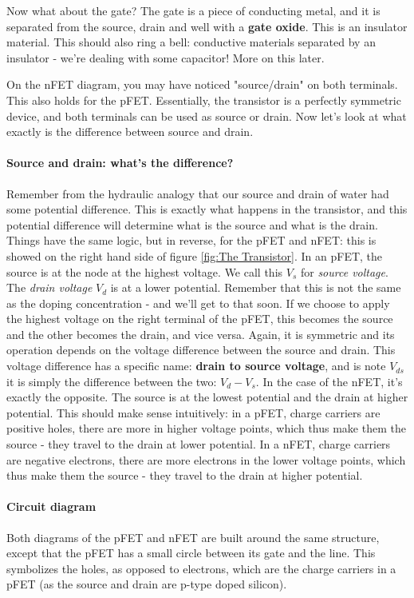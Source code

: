 Now what about the gate? The gate is a piece of conducting metal, and it is separated from the source, drain and well with a \textbf{gate oxide}. This is an insulator material. This should also ring a bell: conductive materials separated by an insulator - we're dealing with some capacitor! More on this later.  

On the nFET diagram, you may have noticed "source/drain" on both terminals. This also holds for the pFET. Essentially, the transistor is a perfectly symmetric device, and both terminals can be used as source or drain. Now let's look at what exactly is the difference between source and drain.

\paragraph{Source and drain: what's the difference?} Remember from the hydraulic analogy that our source and drain of water had some potential difference. This is exactly what happens in the transistor, and this potential difference will determine what is the source and what is the drain. Things have the same logic, but in reverse, for the pFET and nFET: this is showed on the right hand side of figure \ref{fig:The Transistor}. In an pFET, the source is at the node at the highest voltage. We call this $V_s$ for \textit{source voltage}. The \textit{drain voltage} $V_d$ is at a lower potential. Remember that this is not the same as the doping concentration - and we'll get to that soon. If we choose to apply the highest voltage on the right terminal of the pFET, this becomes the source and the other becomes the drain, and vice versa. Again, it is symmetric and its operation depends on the voltage difference between the source and drain. This voltage difference has a specific name: \textbf{drain to source voltage}, and is note $V_{ds}$ it is simply the difference between the two: $V_d - V_s$. In the case of the nFET, it's exactly the opposite. The source is at the lowest potential and the drain at higher potential. This should make sense intuitively: in a pFET, charge carriers are positive holes, there are more in higher voltage points, which thus make them the source - they travel to the drain at lower potential. In a nFET, charge carriers are negative electrons, there are more electrons in the lower voltage points, which thus make them the source - they travel to the drain at higher potential. 

\paragraph{Circuit diagram} Both diagrams of the pFET and nFET are built around the same structure, except that the pFET has a small circle between its gate and the line. This symbolizes the holes, as opposed to electrons, which are the charge carriers in a pFET (as the source and drain are p-type doped silicon).

